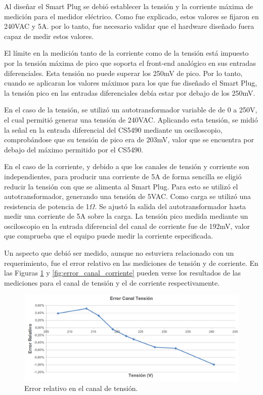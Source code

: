 Al diseñar el Smart Plug se debió establecer la tensión y la corriente máxima de medición para el medidor eléctrico. Como fue explicado, estos valores se fijaron en 240VAC y 5A. por lo tanto, fue necesario validar que el hardware diseñado fuera capaz de medir estos valores.

El límite en la medición tanto de la corriente como de la tensión está impuesto por la tensión máxima de pico que soporta el front-end analógico en sus entradas diferenciales. Esta tensión no puede superar los 250mV de pico. Por lo tanto, cuando se aplicaran los valores máximos para los que fue diseñado el Smart Plug, la tensión pico en las entradas diferenciales debía estar por debajo de los 250mV.

En el caso de la tensión, se utilizó un autotransformador variable de de 0 a 250V, el cual permitió generar una tensión de 240VAC. Aplicando esta tensión, se midió la señal en la entrada diferencial del CS5490 mediante un osciloscopio, comprobándose que su tensión de pico era de 203mV, valor que se encuentra por debajo del máximo permitido por el CS5490.

En el caso de la corriente, y debido a que los canales de tensión y corriente son independientes, para producir una corriente de 5A de forma sencilla se eligió reducir la tensión con que se alimenta al Smart Plug. Para esto se utilizó el autotransformador, generando una tensión de 5VAC. Como carga se utilizó una resistencia de potencia de 1$\Omega$. Se ajustó la salida del autotransformador hasta medir una corriente de 5A sobre la carga. La tensión pico medida mediante un osciloscopio en la entrada diferencial del canal de corriente fue de 192mV, valor que comprueba que el equipo puede medir la corriente especificada.

Un aspecto que debió ser medido, aunque no estuviera relacionado con un requerimiento, fue el error relativo en las mediciones de tensión y de corriente. En las Figuras \ref{fig:error_canal_tensión} y \ref{fig:error_canal_corriente} pueden verse los resultados de las mediciones para el canal de tensión y el de corriente respectivamente.

\begin{figure}[h]
	\centering
	\includegraphics[width=14cm]{./Figures/4_1_1_error_canal_tension.png}
	\caption{Error relativo en el canal de tensión.}
	\label{fig:error_canal_tensión}
\end{figure}

